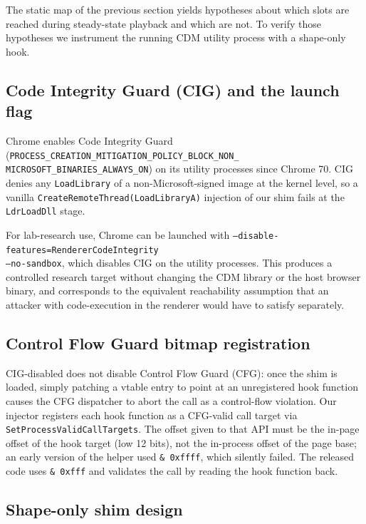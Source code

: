 \documentclass[11pt,letterpaper]{article}
\begin{document}
The static map of the previous section yields hypotheses about which
slots are reached during steady-state playback and which are not.
To verify those hypotheses we instrument the running CDM utility
process with a shape-only hook.

\subsection{Code Integrity Guard (CIG) and the launch flag}
\label{sec:runtime-cig}

Chrome enables Code Integrity Guard
(\texttt{PROCESS\_CREATION\_MITIGATION\_POLICY\_BLOCK\_NON\_\\MICROSOFT\_BINARIES\_ALWAYS\_ON})
on its utility processes since Chrome 70.  CIG denies any
\texttt{LoadLibrary} of a non-Microsoft-signed image at the kernel
level, so a vanilla
\texttt{CreateRemoteThread(LoadLibraryA)} injection of our shim
fails at the \texttt{LdrLoadDll} stage.

For lab-research use, Chrome can be launched with
\texttt{--disable-features=RendererCodeIntegrity\\ --no-sandbox}, which
disables CIG on the utility processes.  This produces a controlled
research target without changing the CDM library or the host browser
binary, and corresponds to the equivalent reachability assumption
that an attacker with code-execution in the renderer would have to
satisfy separately.

\subsection{Control Flow Guard bitmap registration}
\label{sec:runtime-cfg}

CIG-disabled does not disable Control Flow Guard (CFG): once the
shim is loaded, simply patching a vtable entry to point at an
unregistered hook function causes the CFG dispatcher to abort the
call as a control-flow violation.  Our injector registers each hook
function as a CFG-valid call target via
\texttt{SetProcessValidCallTargets}.  The offset given to that API
must be the in-page offset of the hook target (low 12 bits), not
the in-process offset of the page base; an early version of the
helper used \texttt{\& 0xffff}, which silently failed.  The released
code uses \texttt{\& 0xfff} and validates the call by reading the
hook function back.

\subsection{Shape-only shim design}
\label{sec:runtime-shape}
\end{document}

